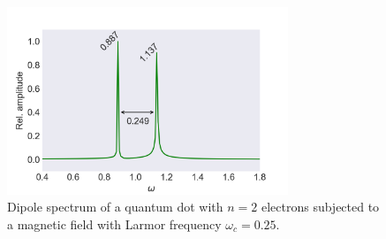 \begin{figure}
    \centering    
    \includegraphics[width=0.75\textwidth]
        {results/figures/B_field/n=4/b_spectrum_n=4_omc=025.png}
    \caption{Dipole spectrum of a quantum dot with $n=2$ electrons
    subjected to a magnetic field with Larmor frequency $\omega_c=0.25$.}
    \label{fig:b_n4_omc025}
\end{figure}
